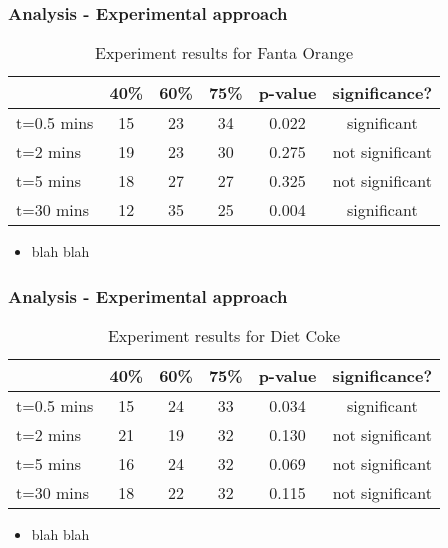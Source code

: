 \documentclass[compress,handout,10pt]{beamer}
\let\olditem\item
\renewcommand{\item}{\setlength{\itemsep}{0.5\baselineskip}\olditem}
\begin{document}
\begin{frame}
    \frametitle{Analysis - Experimental approach}
\begin{table}[ h]
\centering
\begin{tabular}{ l || c|c|c||c|c }
  &40\% &60\% & 75\% &p-value &significance? \\
\hline  
t=0.5 mins & 15 & 23 & 34&0.022&significant\\ 
\hline  
t=2 mins & 19 & 23 & 30&0.275&not significant\\ 
\hline  
t=5 mins & 18 & 27 & 27&0.325&not significant\\ 
\hline  
t=30 mins & 12 & 35 & 25&0.004&significant\\ 
\hline     
 \end{tabular}
\caption{Experiment results for Fanta Orange}

\end{table}

\begin{itemize}
\item blah blah
\end{itemize}
\end{frame}

\begin{frame}
    \frametitle{Analysis - Experimental approach}
\begin{table}[ h]
\centering
\begin{tabular}{ l || c|c|c||c|c }
  &40\% &60\% & 75\% &p-value &significance? \\
\hline  
t=0.5 mins & 15 & 24 & 33&0.034&significant\\ 
\hline  
t=2 mins & 21& 19 & 32&0.130 &not significant\\ 
\hline  
t=5 mins & 16 & 24 & 32&0.069&not significant\\ 
\hline  
t=30 mins & 18 & 22& 32&0.115&not significant\\ 
\hline  
 \end{tabular}
\caption{Experiment results for Diet Coke}
\end{table}

\begin{itemize}
\item blah blah
\end{itemize}
\end{frame}
\end{document}
